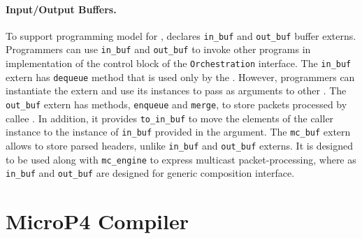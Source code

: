 \documentclass[letterpaper,twocolumn,10pt]{article}
\begin{document}
\paragraph{Input/Output Buffers.}
To support programming model for \uswitch, \uarch declares 
\texttt{in\_buf} and \texttt{out\_buf} buffer externs. Programmers
can use \texttt{in\_buf} and \texttt{out\_buf} to invoke other 
programs in implementation of the control block of the
\texttt{Orchestration} interface. The \texttt{in\_buf} extern has 
\texttt{dequeue} method that is used only by the \uswitch. However, 
programmers can instantiate the extern and use its instances to pass 
as arguments to other \upackages.
The \texttt{out\_buf} extern has methods, \texttt{enqueue} and 
\texttt{merge}, to store packets processed by callee \upackages.
In addition, it provides \texttt{to\_in\_buf} to move the elements of 
the caller instance to the instance of \texttt{in\_buf} provided in 
the argument. The \texttt{mc\_buf} extern allows to store parsed 
headers, unlike \texttt{in\_buf} and \texttt{out\_buf} externs.
It is designed to  be used along with \texttt{mc\_engine} to express 
multicast packet-processing, where as \texttt{in\_buf} and 
\texttt{out\_buf} are designed for generic composition interface.





\section{MicroP4 Compiler}
\label{sec:compiler}
\end{document}
